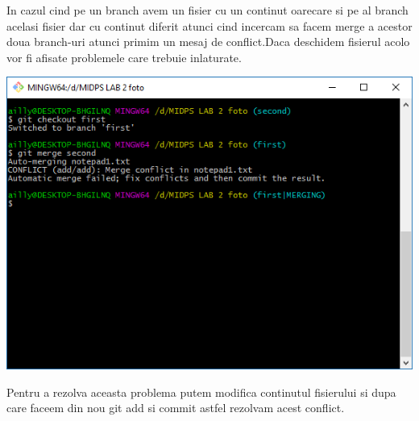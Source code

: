 In cazul cind pe un branch avem un fisier cu un continut oarecare si pe al branch acelasi fisier dar cu continut diferit atunci cind incercam sa facem merge a acestor doua branch-uri atunci primim un mesaj de conflict.Daca deschidem fisierul acolo vor fi afisate problemele care trebuie inlaturate.\\
\begin{center}
 
 \includegraphics[scale=0.75]{images/14}\\
\end{center}
Pentru a rezolva aceasta problema putem modifica continutul fisierului si dupa care faceem din nou git add si commit astfel rezolvam acest conflict.\\

\clearpage